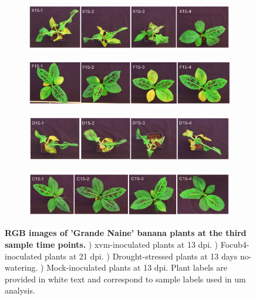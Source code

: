 \begin{figure}[ph!]
  \centering
  \begin{subfigure}[b]{\textwidth}
    \includegraphics[width=\textwidth]{Figures/ThirdTimePointXanthomonasBLQs.pdf}
    \caption{}
    \label{fig:XvmThirdTimeBLQs}
  \end{subfigure}
   \begin{subfigure}[b]{\textwidth}
    \includegraphics[width=\textwidth]{Figures/ThirdTimePointFusariumBLQs.pdf}
    \caption{}
    \label{fig:FocThirdTimeBLQs}
  \end{subfigure}
     \begin{subfigure}[b]{\textwidth}
    \includegraphics[width=\textwidth]{Figures/ThirdTimePointDroughtBLQs.pdf}
    \caption{}
    \label{fig:DroThirdTimeBLQs}
  \end{subfigure}
     \begin{subfigure}[b]{\textwidth}
    \includegraphics[width=\textwidth]{Figures/ThirdTimePointControlBLQs.pdf}
    \caption{}
    \label{fig:ConThirdTimeBLQs}
  \end{subfigure}
  \caption[RGB images of 'Grande Naine' banana plants at the third sample time points.]{\textbf{RGB images of 'Grande Naine' banana plants at the third sample time points.}
  \textbf{}) \acl{xvm}-inoculated plants at 13 \acl{dpi}.
  \textbf{}) \acl{Focub4}-inoculated plants at 21 \acl{dpi}.
  \textbf{}) Drought-stressed plants at 13 days no-watering.
  \textbf{}) Mock-inoculated plants at 13 \ac{dpi}.
  Plant labels are provided in white text and correspond to sample labels used in \acl{um} analysis.
  }
  \label{fig:ThridTimePointSymptoms}
\end{figure}

